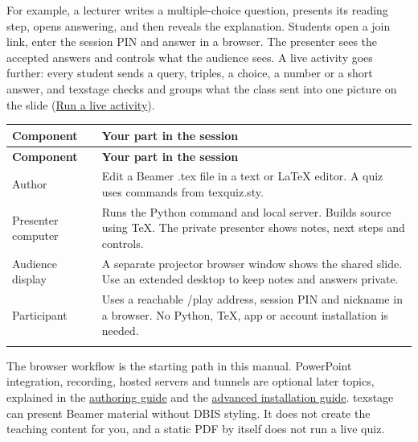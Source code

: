 \documentclass[a4paper,11pt]{article}
\begin{document}
For example, a lecturer writes a multiple-\allowbreak{}choice question, presents its reading step, opens answering, and then reveals the explanation.\allowbreak{} Students open a join link, enter the session PIN and answer in a browser.\allowbreak{} The presenter sees the accepted answers and controls what the audience sees.\allowbreak{} A live activity goes further: every student sends a query, triples, a choice, a number or a short answer, and texstage checks and groups what the class sent into one picture on the slide (\hyperref[sec:run-a-live-activity]{Run a live activity}).\par

{\small
\begin{longtable}{>{\raggedright\arraybackslash}p{}>{\raggedright\arraybackslash}p{}}
\toprule
\textbf{Component} & \textbf{Your part in the session} \\
\midrule
\endfirsthead
\toprule
\textbf{Component} & \textbf{Your part in the session} \\
\midrule
\endhead
\midrule
\endfoot
\bottomrule
\endlastfoot
Author & Edit a Beamer .\allowbreak{}tex file in a text or LaTeX editor.\allowbreak{} A quiz uses commands from texquiz.\allowbreak{}sty. \\ \addlinespace[3pt]
Presenter computer & Runs the Python command and local server.\allowbreak{} Builds source using TeX.\allowbreak{} The private presenter shows notes, next steps and controls. \\ \addlinespace[3pt]
Audience display & A separate projector browser window shows the shared slide.\allowbreak{} Use an extended desktop to keep notes and answers private. \\ \addlinespace[3pt]
Participant & Uses a reachable /\allowbreak{}play address, session PIN and nickname in a browser.\allowbreak{} No Python, TeX, app or account installation is needed. \\ \addlinespace[3pt]
\end{longtable}}

The browser workflow is the starting path in this manual.\allowbreak{} PowerPoint integration, recording, hosted servers and tunnels are optional later topics, explained in the \href{\manualdocroot authoring.md}{authoring guide} and the \href{\manualdocroot installation-advanced.md}{advanced installation guide}.\allowbreak{} texstage can present Beamer material without DBIS styling.\allowbreak{} It does not create the teaching content for you, and a static PDF by itself does not run a live quiz.\par
\end{document}
